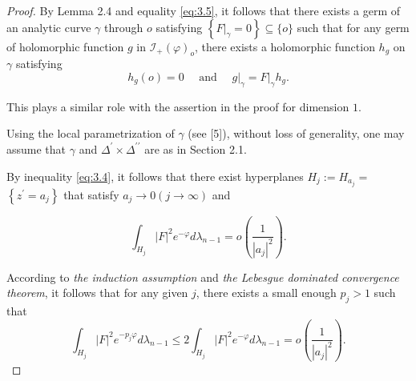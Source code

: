 \documentclass[lang=en,12pt,twoside]{textbook}
\begin{document}
\begin{proof}
By Lemma 2.4 and equality \ref{eq:3.5}, it follows that there exists a germ of an analytic curve $\gamma$ through $o$ satisfying $\left\{\left.F\right|_\gamma=0\right\} \subseteq\{o\}$ such that for any germ of holomorphic function $g$ in $\mathcal{I}_{+}(\varphi)_o$, there exists a holomorphic function $h_g$ on $\gamma$ satisfying
\begin{equation}\label{eq:3.6}
    h_g(o)=0 \quad \text { and }\left.\quad g\right|_\gamma=\left.F\right|_\gamma h_g .
\end{equation}

This plays a similar role with the assertion in the proof for dimension $1$.

Using the local parametrization of $\gamma$ (see [5]), without loss of generality, one may assume that $\gamma$ and $\Delta^{\prime} \times \Delta^{\prime \prime}$ are as in Section 2.1.

By inequality \eqref{eq:3.4}, it follows that there exist hyperplanes $H_j:=H_{a_j}=$ $\left\{z^{\prime}=a_j\right\}$ that satisfy $a_j \rightarrow 0(j \rightarrow \infty)$ and

\begin{equation}\label{eq:convergence}
    \int_{H_j}|F|^2 e^{-\varphi} d \lambda_{n-1}=o\left(\frac{1}{\left|a_j\right|^2}\right) .
\end{equation}


According to \textit{the induction assumption} and \textit{the Lebesgue dominated convergence theorem}, it follows that for any given $j$, there exists a small enough $p_j>1$ such that
\begin{equation}\label{eq:3.7}
    \int_{H_j}|F|^2 e^{-p_j \varphi} d \lambda_{n-1} \leq 2 \int_{H_j}|F|^2 e^{-\varphi} d \lambda_{n-1}=o\left(\frac{1}{\left|a_j\right|^2}\right) .
\end{equation}


\end{proof}
\end{document}
